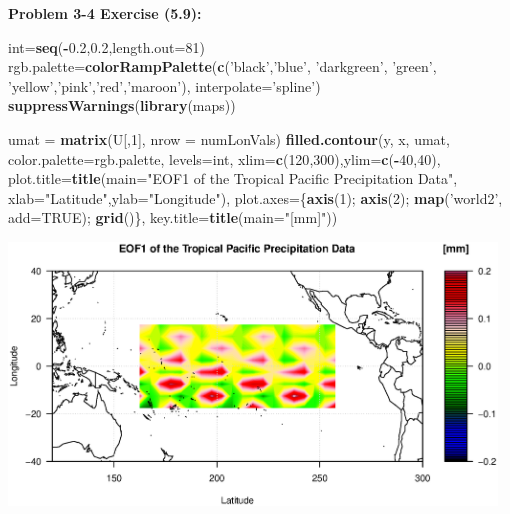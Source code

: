 \documentclass[11pt]{article}
\newenvironment{problem}[1]{\textbf{Problem #1:}}{\newpage}
\newenvironment{Shaded}{\begin{snugshade}}{\end{snugshade}}
\newcommand{\DataTypeTok}[1]{\textcolor[rgb]{0.13,0.29,0.53}{#1}}
\newcommand{\DecValTok}[1]{\textcolor[rgb]{0.00,0.00,0.81}{#1}}
\newcommand{\FloatTok}[1]{\textcolor[rgb]{0.00,0.00,0.81}{#1}}
\newcommand{\KeywordTok}[1]{\textcolor[rgb]{0.13,0.29,0.53}{\textbf{#1}}}
\newcommand{\NormalTok}[1]{#1}
\newcommand{\OperatorTok}[1]{\textcolor[rgb]{0.81,0.36,0.00}{\textbf{#1}}}
\newcommand{\OtherTok}[1]{\textcolor[rgb]{0.56,0.35,0.01}{#1}}
\newcommand{\StringTok}[1]{\textcolor[rgb]{0.31,0.60,0.02}{#1}}
\begin{document}
\begin{problem}{3-4 Exercise (5.9)}
\begin{enumerate}[label = (\alph*)]
\begin{Shaded}
\begin{Highlighting}[]
\NormalTok{int=}\KeywordTok{seq}\NormalTok{(}\OperatorTok{-}\FloatTok{0.2}\NormalTok{,}\FloatTok{0.2}\NormalTok{,}\DataTypeTok{length.out=}\DecValTok{81}\NormalTok{)}
\NormalTok{rgb.palette=}\KeywordTok{colorRampPalette}\NormalTok{(}\KeywordTok{c}\NormalTok{(}\StringTok{'black'}\NormalTok{,}\StringTok{'blue'}\NormalTok{, }\StringTok{'darkgreen'}\NormalTok{,}
                               \StringTok{'green'}\NormalTok{, }\StringTok{'yellow'}\NormalTok{,}\StringTok{'pink'}\NormalTok{,}\StringTok{'red'}\NormalTok{,}\StringTok{'maroon'}\NormalTok{),}
                               \DataTypeTok{interpolate=}\StringTok{'spline'}\NormalTok{)}
\KeywordTok{suppressWarnings}\NormalTok{(}\KeywordTok{library}\NormalTok{(maps))}
\end{Highlighting}
\end{Shaded}
\newpage
\begin{Shaded}
\begin{Highlighting}[]
\NormalTok{umat =}\StringTok{ }\KeywordTok{matrix}\NormalTok{(U[,}\DecValTok{1}\NormalTok{], }\DataTypeTok{nrow =}\NormalTok{ numLonVals)}
\KeywordTok{filled.contour}\NormalTok{(y, x, umat, }\DataTypeTok{color.palette=}\NormalTok{rgb.palette, }\DataTypeTok{levels=}\NormalTok{int,}
               \DataTypeTok{xlim=}\KeywordTok{c}\NormalTok{(}\DecValTok{120}\NormalTok{,}\DecValTok{300}\NormalTok{),}\DataTypeTok{ylim=}\KeywordTok{c}\NormalTok{(}\OperatorTok{-}\DecValTok{40}\NormalTok{,}\DecValTok{40}\NormalTok{),}
               \DataTypeTok{plot.title=}\KeywordTok{title}\NormalTok{(}\DataTypeTok{main=}\StringTok{"EOF1 of the Tropical Pacific}
                                     \StringTok{ Precipitation Data"}\NormalTok{,}
                                \DataTypeTok{xlab=}\StringTok{"Latitude"}\NormalTok{,}\DataTypeTok{ylab=}\StringTok{"Longitude"}\NormalTok{),}
               \DataTypeTok{plot.axes=}\NormalTok{\{}\KeywordTok{axis}\NormalTok{(}\DecValTok{1}\NormalTok{); }\KeywordTok{axis}\NormalTok{(}\DecValTok{2}\NormalTok{); }\KeywordTok{map}\NormalTok{(}\StringTok{'world2'}\NormalTok{, }\DataTypeTok{add=}\OtherTok{TRUE}\NormalTok{); }\KeywordTok{grid}\NormalTok{()\},}
               \DataTypeTok{key.title=}\KeywordTok{title}\NormalTok{(}\DataTypeTok{main=}\StringTok{"[mm]"}\NormalTok{))}
\end{Highlighting}
\end{Shaded}
\includegraphics[height = 7cm]{Figures/Prob3/EOF1}

\end{enumerate}
\end{problem}
\end{document}
